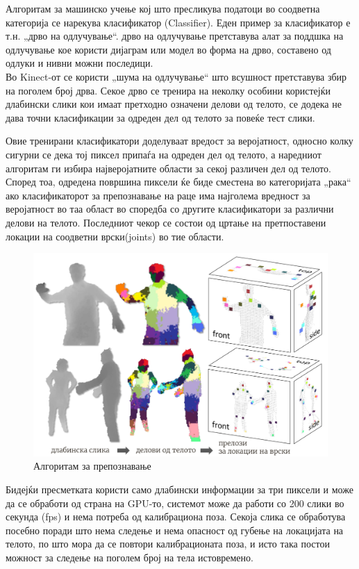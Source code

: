 \documentclass[12pt]{article}
\begin{document}
  Алгоритам за машинско учење кој што пресликува податоци во соодветна категорија се нарекува класификатор (Classifier). Еден пример за класификатор е т.н. „дрво на одлучување“. дрво на одлучување претставува алат за поддшка на одлучување кое користи дијаграм или модел во форма на дрво, составено од одлуки и нивни можни последици.\\
  Во Kinect-от се користи „шума на одлучување“ што всушност претставува збир на поголем број дрва. Секое дрво се тренира на неколку особини користејќи длабински слики кои имаат претходно означени делови од телото, се додека не дава точни класификации за одреден дел од телото за повеќе тест слики.

  Овие тренирани класификатори доделуваат вредост за веројатност, односно колку сигурни се дека тој пиксел припаѓа на одреден дел од телото, а наредниот алгоритам ги избира најверојатните области за секој различен дел од телото. Според тоа, одредена површина пиксели ќе биде сместена во категоријата „рака“ ако класификаторот за препознавање на раце има најголема вредност за веројатност во таа област во споредба со другите класификатори за различни делови на телото. Последниот чекор се состои од цртање на претпоставени локации на соодветни врски(joints) во тие области.

  \begin{figure}[H]
    \includegraphics[width=0.75\linewidth]{./images/bodyparts.png}
    \centering
    \caption{Алгоритам за препознавање}
    \label{fig:bodyparts.png}
    \end{figure}

  Бидејќи пресметката користи само длабински информации за три пиксели и може да се обработи од страна на GPU-то, системот може да работи со 200 слики во секунда (fps) и нема потреба од калибрациона поза. Секоја слика се обработува посебно поради што нема следење и нема опасност од губење на локацијата на телото, по што мора да се повтори калибрационата поза, и исто така постои можност за следење на поголем број на тела истовремено.
\end{document}
